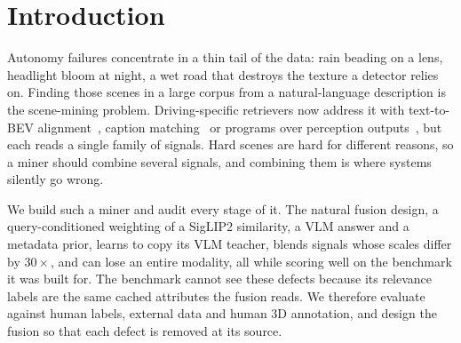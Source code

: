 \documentclass[10pt,twocolumn,letterpaper]{article}
\begin{document}
\section{Introduction}

Autonomy failures concentrate in a thin tail of the data: rain beading on a lens,
headlight bloom at night, a wet road that destroys the texture a detector relies
on. Finding those scenes in a large corpus from a natural-language description is
the scene-mining problem. Driving-specific retrievers now address it with
text-to-BEV alignment~\cite{tang2025bevtsr}, caption
matching~\cite{ki2025carim} or programs over perception
outputs~\cite{davidson2026refav}, but each reads a single family of signals.
Hard scenes are hard for different reasons, so a miner should combine several
signals, and combining them is where systems silently go wrong.

We build such a miner and audit every stage of it. The natural fusion design,
a query-conditioned weighting of a SigLIP2 similarity, a VLM answer and a
metadata prior, learns to copy its VLM teacher, blends signals whose scales differ
by $30\times$, and can lose an entire modality, all while scoring well on the
benchmark it was built for. The benchmark cannot see these defects because its
relevance labels are the same cached attributes the fusion reads. We therefore
evaluate against human labels, external data and human 3D annotation, and design
the fusion so that each defect is removed at its source.
\end{document}
